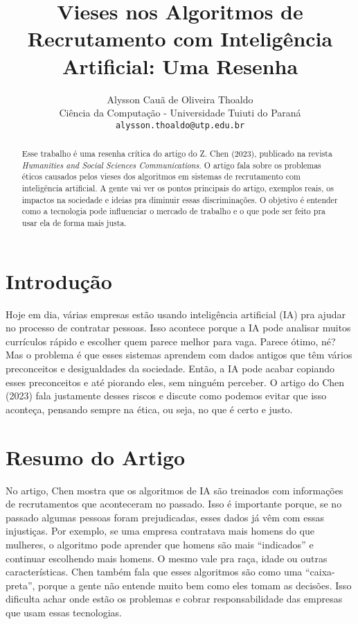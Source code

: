 \documentclass[english]{article}
\title{Vieses nos Algoritmos de Recrutamento com Inteligência Artificial: Uma Resenha}
\author{Alysson Cauã de Oliveira Thoaldo \\
Ciência da Computação - Universidade Tuiuti do Paraná \\
\texttt{alysson.thoaldo@utp.edu.br}}
\date{}
\begin{document}
\maketitle

\begin{abstract}
Esse trabalho é uma resenha crítica do artigo do Z. Chen (2023), publicado na revista \textit{Humanities and Social Sciences Communications}. O artigo fala sobre os problemas éticos causados pelos vieses dos algoritmos em sistemas de recrutamento com inteligência artificial. A gente vai ver os pontos principais do artigo, exemplos reais, os impactos na sociedade e ideias pra diminuir essas discriminações. O objetivo é entender como a tecnologia pode influenciar o mercado de trabalho e o que pode ser feito pra usar ela de forma mais justa.
\end{abstract}

\section{Introdução}
Hoje em dia, várias empresas estão usando inteligência artificial (IA) pra ajudar no processo de contratar pessoas. Isso acontece porque a IA pode analisar muitos currículos rápido e escolher quem parece melhor para vaga. Parece ótimo, né? Mas o problema é que esses sistemas aprendem com dados antigos que têm vários preconceitos e desigualdades da sociedade. Então, a IA pode acabar copiando esses preconceitos e até piorando eles, sem ninguém perceber. O artigo do Chen (2023) fala justamente desses riscos e discute como podemos evitar que isso aconteça, pensando sempre na ética, ou seja, no que é certo e justo.

\section{Resumo do Artigo}
No artigo, Chen mostra que os algoritmos de IA são treinados com informações de recrutamentos que aconteceram no passado. Isso é importante porque, se no passado algumas pessoas foram prejudicadas, esses dados já vêm com essas injustiças. Por exemplo, se uma empresa contratava mais homens do que mulheres, o algoritmo pode aprender que homens são mais “indicados” e continuar escolhendo mais homens. O mesmo vale pra raça, idade ou outras características. Chen também fala que esses algoritmos são como uma “caixa-preta”, porque a gente não entende muito bem como eles tomam as decisões. Isso dificulta achar onde estão os problemas e cobrar responsabilidade das empresas que usam essas tecnologias.
\end{document}
